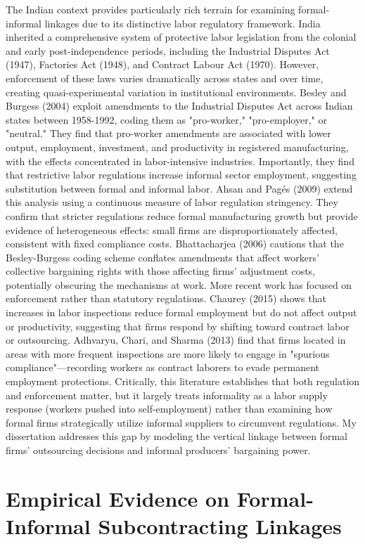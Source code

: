 The Indian context provides particularly rich terrain for examining formal-informal linkages due to its distinctive labor regulatory framework. India inherited a comprehensive system of protective labor legislation from the colonial and early post-independence periods, including the Industrial Disputes Act (1947), Factories Act (1948), and Contract Labour Act (1970). However, enforcement of these laws varies dramatically across states and over time, creating quasi-experimental variation in institutional environments.
Besley and Burgess (2004) exploit amendments to the Industrial Disputes Act across Indian states between 1958-1992, coding them as "pro-worker," "pro-employer," or "neutral." They find that pro-worker amendments are associated with lower output, employment, investment, and productivity in registered manufacturing, with the effects concentrated in labor-intensive industries. Importantly, they find that restrictive labor regulations increase informal sector employment, suggesting substitution between formal and informal labor.
Ahsan and Pagés (2009) extend this analysis using a continuous measure of labor regulation stringency. They confirm that stricter regulations reduce formal manufacturing growth but provide evidence of heterogeneous effects: small firms are disproportionately affected, consistent with fixed compliance costs. Bhattacharjea (2006) cautions that the Besley-Burgess coding scheme conflates amendments that affect workers' collective bargaining rights with those affecting firms' adjustment costs, potentially obscuring the mechanisms at work.
More recent work has focused on enforcement rather than statutory regulations. Chaurey (2015) shows that increases in labor inspections reduce formal employment but do not affect output or productivity, suggesting that firms respond by shifting toward contract labor or outsourcing. Adhvaryu, Chari, and Sharma (2013) find that firms located in areas with more frequent inspections are more likely to engage in "spurious compliance"—recording workers as contract laborers to evade permanent employment protections.
Critically, this literature establishes that both regulation and enforcement matter, but it largely treats informality as a labor supply response (workers pushed into self-employment) rather than examining how formal firms strategically utilize informal suppliers to circumvent regulations. My dissertation addresses this gap by modeling the vertical linkage between formal firms' outsourcing decisions and informal producers' bargaining power.


\section{Empirical Evidence on Formal-Informal Subcontracting Linkages}
